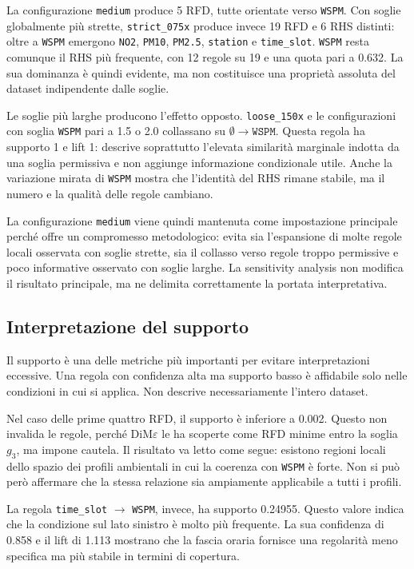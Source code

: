 \documentclass[a4paper,12pt]{article}
\newcommand{\Dime}{DiM\ensuremath{\varepsilon}}
\newcommand{\PMdue}{\texttt{PM2.5}}
\newcommand{\PMdieci}{\texttt{PM10}}
\newcommand{\NOdue}{\texttt{NO2}}
\newcommand{\Wspm}{\texttt{WSPM}}
\newcommand{\Station}{\texttt{station}}
\newcommand{\TimeSlot}{\texttt{time\_slot}}
\begin{document}
La configurazione \texttt{medium} produce 5 RFD, tutte orientate verso \Wspm. Con soglie globalmente più strette, \texttt{strict\_075x} produce invece 19 RFD e 6 RHS distinti: oltre a \Wspm{} emergono \NOdue, \PMdieci, \PMdue, \Station{} e \TimeSlot. \Wspm{} resta comunque il RHS più frequente, con 12 regole su 19 e una quota pari a 0.632. La sua dominanza è quindi evidente, ma non costituisce una proprietà assoluta del dataset indipendente dalle soglie.

Le soglie più larghe producono l'effetto opposto. \texttt{loose\_150x} e le configurazioni con soglia \Wspm{} pari a 1.5 o 2.0 collassano su $\emptyset \rightarrow \texttt{WSPM}$. Questa regola ha supporto 1 e lift 1: descrive soprattutto l'elevata similarità marginale indotta da una soglia permissiva e non aggiunge informazione condizionale utile. Anche la variazione mirata di \Wspm{} mostra che l'identità del RHS rimane stabile, ma il numero e la qualità delle regole cambiano.

La configurazione \texttt{medium} viene quindi mantenuta come impostazione principale perché offre un compromesso metodologico: evita sia l'espansione di molte regole locali osservata con soglie strette, sia il collasso verso regole troppo permissive e poco informative osservato con soglie larghe. La sensitivity analysis non modifica il risultato principale, ma ne delimita correttamente la portata interpretativa.

\subsection{Interpretazione del supporto}

Il supporto è una delle metriche più importanti per evitare interpretazioni eccessive. Una regola con confidenza alta ma supporto basso è affidabile solo nelle condizioni in cui si applica. Non descrive necessariamente l'intero dataset.

Nel caso delle prime quattro RFD, il supporto è inferiore a 0.002. Questo non invalida le regole, perché \Dime{} le ha scoperte come RFD minime entro la soglia $g_3$, ma impone cautela. Il risultato va letto come segue: esistono regioni locali dello spazio dei profili ambientali in cui la coerenza con \Wspm{} è forte. Non si può però affermare che la stessa relazione sia ampiamente applicabile a tutti i profili.

La regola \TimeSlot{} $\rightarrow$ \Wspm, invece, ha supporto 0.24955. Questo valore indica che la condizione sul lato sinistro è molto più frequente. La sua confidenza di 0.858 e il lift di 1.113 mostrano che la fascia oraria fornisce una regolarità meno specifica ma più stabile in termini di copertura.
\end{document}
